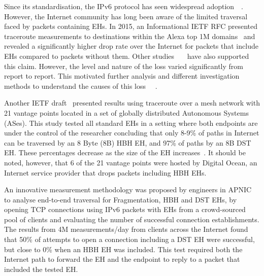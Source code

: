 \documentclass[conference]{IEEEtran}
\begin{document}
\label{sec:motivation}

Since its standardisation, the IPv6 protocol has seen
widespread adoption~\cite{v6adoption_ton}~\cite{google_stats}. However,
the Internet community has long been aware of the limited traversal faced
by packets containing EHs.  In 2015, an Informational IETF RFC presented
traceroute measurements to destinations within the Alexa top 1M
domains~\cite{RFC7872} and revealed a significantly higher drop rate over the Internet for
packets that include EHs compared to packets without them.
Other studies~\cite{james}~\cite{nalini-iepg114}~\cite{apnic} have also
supported this claim.  However, the level and nature of the loss varied
significantly from report to report. This motivated further analysis and
different investigation methods to understand the causes of this loss
~\cite{james}~\cite{elkins-v6ops-eh-deepdive-fw-01}.  

Another IETF draft~\cite{james} presented results using traceroute over a
mesh network with 21 vantage points located in a set of globally distributed
Autonomous Systems (ASes). This study tested all standard EHs in a setting
where both endpoints are under the control of the researcher concluding that
only 8-9\% of paths in Internet can be traversed by an 8 Byte (8B) HBH EH, and 97\% of paths by an 8B DST EH.  These percentages decrease as the
size of the EH increases~\cite{james-imc}. It should be noted, however, that 6
of the 21 vantage points were hosted by Digital Ocean\texttrademark, an
Internet service provider that drops packets including HBH EHs.

An innovative measurement methodology was proposed by engineers in
APNIC~\cite{apnic} to analyse end-to-end traversal for Fragmentation, HBH and
DST EHs, by opening TCP connections using IPv6 packets
with EHs from a crowd-sourced pool of clients and evaluating the number of
successful connection establishments.  The results from 4M
measurements/day from clients across the Internet found that 50\%  of
attempts to open a connection including a DST EH were successful, but close to 0\%
when an HBH EH was included.  This test
required both the Internet path to forward the EH and the endpoint to reply to
a packet that included the tested EH. 

\end{document}
